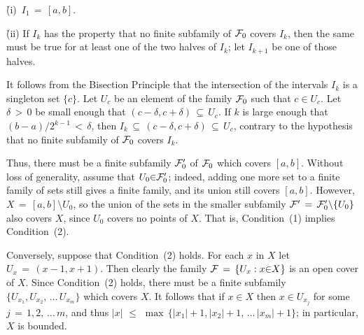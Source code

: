 \V

        \h (i)\, $I_{1} \,=\, [a,b]$.

        \h (ii) If $I_{k}$ has the property that no finite subfamily of ${\cal F}_{0}$ covers $I_{k}$,
    then the same must be true for at least one of the two halves of $I_{k}$; let $I_{k+1}$ be one of those halves.

\V

\noindent It follows from the Bisection Principle that the intersection of the intervals $I_{k}$ is a singleton set $\{c\}$.
    Let $U_{c}$ be an element of the family ${\cal F}_{0}$ such that $c{\in}U_{c}$.
    Let ${\delta}\,>\,0$ be small enough that $(c-{\delta},c+{\delta}) \,{\subseteq}\, U_{c}$.
    If $k$ is large enough that $(b-a)/2^{k-1}\,<\,{\delta}$, then $I_{k} \,{\subseteq}\, (c-{\delta},c+{\delta}) \,{\subseteq}\, U_{c}$, contrary to the hypothesis that no finite subfamily of ${\cal F}_{0}$ covers $I_{k}$.

        Thus, there must be a finite subfamily ${\cal F}_{0}'$ of ${\cal F}_{0}$ which covers $[a,b]$.
    Without loss of generality, assume that $U_{0}{\in}{\cal F}'_{0}$; indeed,
    adding one more set to a finite family of sets still gives a finite family, and its union still covers $[a,b]$.
    However, $X \,=\, [a,b]{\setminus}U_{0}$, so the union of the sets in the smaller subfamily ${\cal F}' \,=\, {\cal F}'_{0}{\setminus}\{U_{0}\}$ also covers $X$,
    since $U_{0}$ covers no points of $X$.
    That is, Condition~(1) implies Condition~(2).

        Conversely, suppose that Condition~(2) holds. For each $x$ in $X$ let $U_{x} \,=\, (x-1,x+1)$.
    Then clearly the family ${\cal F} \,=\, \{U_{x}:x{\in}X\}$ is an open cover of $X$.
    Since Condition~(2) holds, there must be a finite subfamily $\{U_{x_{1}}, U_{x_{2}},\,{\ldots}\,U_{x_{m}}\}$ which covers $X$.
    It follows that if $x{\in}X$ then $x{\in}U_{x_{j}}$ for some $j \,=\, 1,2,\,{\ldots}\,m$, and thus 
    $|x|\,\,{\leq}\,\,\max\,\{|x_{1}|+1,|x_{2}|+1,\,{\ldots}\,|x_{m}|+1\}$; in particular, $X$ is bounded.


